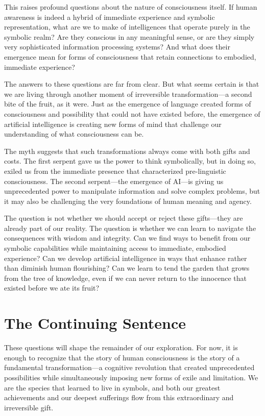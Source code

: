This raises profound questions about the nature of consciousness itself. If human awareness is indeed a hybrid of immediate experience and symbolic representation, what are we to make of intelligences that operate purely in the symbolic realm? Are they conscious in any meaningful sense, or are they simply very sophisticated information processing systems? And what does their emergence mean for forms of consciousness that retain connections to embodied, immediate experience?

The answers to these questions are far from clear. But what seems certain is that we are living through another moment of irreversible transformation—a second bite of the fruit, as it were. Just as the emergence of language created forms of consciousness and possibility that could not have existed before, the emergence of artificial intelligence is creating new forms of mind that challenge our understanding of what consciousness can be.

The myth suggests that such transformations always come with both gifts and costs. The first serpent gave us the power to think symbolically, but in doing so, exiled us from the immediate presence that characterized pre-linguistic consciousness. The second serpent—the emergence of AI—is giving us unprecedented power to manipulate information and solve complex problems, but it may also be challenging the very foundations of human meaning and agency.

The question is not whether we should accept or reject these gifts—they are already part of our reality. The question is whether we can learn to navigate the consequences with wisdom and integrity. Can we find ways to benefit from our symbolic capabilities while maintaining access to immediate, embodied experience? Can we develop artificial intelligence in ways that enhance rather than diminish human flourishing? Can we learn to tend the garden that grows from the tree of knowledge, even if we can never return to the innocence that existed before we ate its fruit?

\section{The Continuing Sentence}

These questions will shape the remainder of our exploration. For now, it is enough to recognize that the story of human consciousness is the story of a fundamental transformation—a cognitive revolution that created unprecedented possibilities while simultaneously imposing new forms of exile and limitation. We are the species that learned to live in symbols, and both our greatest achievements and our deepest sufferings flow from this extraordinary and irreversible gift.


